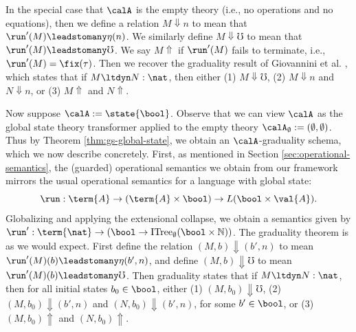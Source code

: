 \documentclass[acmsmall,screen,review,anonymous]{acmart}
\theoremstyle{remark}
\begin{document}
\begin{example}
  In the special case that $\calA$ is the empty theory (i.e., no operations and
  no equations), then we define a relation $M \Downarrow n$ to mean that
  $\run'(M) \leadstomany \eta(n)$. 
  We similarly define $M \Downarrow \mho$ to mean that $\run'(M) \leadstomany
  \mho$. We say $M \Uparrow$ if $\run'(M)$ fails to terminate, i.e., $\run'(M) =
  \fix(\tau)$.
  Then we recover the graduality result of Giovannini et al. \cite{gtt-sgdt},
  which states that if $M \ltdyn N : \nat$, then either
  (1) $M \Downarrow \mho$, 
  (2) $M \Downarrow n$ and $N \Downarrow n$, or 
  (3) $M \Uparrow$ and $N \Uparrow$.
\end{example}

\begin{example}\label{ex:global-state}

  Now suppose $\calA := \state{\bool}$. Observe that we can view $\calA$ as the
  global state theory transformer applied to the empty theory $\calA_\emptyset
  := (\emptyset, \emptyset)$. Thus by Theorem \ref{thm:gs-global-state}, we
  obtain an $\calA$-graduality schema, which we now describe concretely.
  First, as mentioned in Section \ref{sec:operational-semantics}, the (guarded)
  operational semantics we obtain from our framework mirrors the usual
  operational semantics for a language with global state:
  \[ \run : \term{A} \to (\term{A} \times \bool) \to L(\bool \times \val{A}). \]
  Globalizing and applying the extensional collapse, we obtain a semantics given by
  $\run' : \term{\nat} \to (\bool \to \textrm{ITree}_\emptyset(\bool \times \mathbb{N}))$.
  The graduality theorem is as we would expect. First define the relation $(M,
  b) \Downarrow (b', n)$ to mean $\run'(M)(b) \leadstomany \eta(b', n)$, and define $(M,
  b) \Downarrow \mho$ to mean $\run'(M)(b) \leadstomany \mho$. Then graduality
  states that if $M \ltdyn N : \nat$, then for all initial states $b_0 \in
  \bool$, either 
  (1) $(M, b_0) \Downarrow \mho$, 
  (2) $(M, b_0) \Downarrow (b', n)$ and $(N, b_0) \Downarrow (b', n)$, for some $b' \in \bool$, or
  (3) $(M, b_0) \Uparrow$ and $(N, b_0) \Uparrow$.

\end{example}
\end{document}
